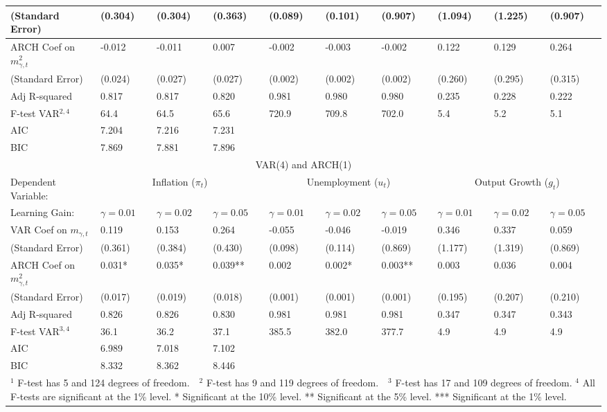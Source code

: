 \documentclass[12pt]{article}
\begin{document}
\begin{table}
\begin{small}
\begin{center}
\begin{tabular}{l|p{0.64in} p{0.64in} p{0.64in}|p{0.64in} p{0.64in} p{0.64in}|p{0.64in} p{0.64in} p{0.64in}}
(Standard Error) & (0.304) & (0.304) & (0.363) & (0.089) & (0.101) & (0.907) & (1.094) & (1.225) & (0.907) \\ \hline
ARCH Coef on $m_{\gamma,t}^2$ & -0.012 & -0.011 & 0.007 & -0.002 & -0.003 & -0.002 & 0.122 & 0.129 & 0.264 \\
(Standard Error) & (0.024) & (0.027) & (0.027) & (0.002) & (0.002) & (0.002) & (0.260) & (0.295) & (0.315) \\ \hline
Adj R-squared & 0.817 & 0.817 & 0.820 & 0.981 & 0.980 & 0.980 & 0.235 & 0.228 & 0.222 \\ 
F-test VAR$^{2,4}$ & 64.4 & 64.5 & 65.6 & 720.9 & 709.8 & 702.0 & 5.4 & 5.2 & 5.1 \\ 
AIC & 7.204 & 7.216 & 7.231   & & &   & & & \\ 
BIC & 7.869 & 7.881 & 7.896   & & &   & & & \\ \hline \hline
\multicolumn{10}{c}{VAR(4) and ARCH(1)} \\ \hline \hline
Dependent Variable:  & \multicolumn{3}{c|}{Inflation ($\pi_t$)} & \multicolumn{3}{c|}{Unemployment ($u_t$)} &  \multicolumn{3}{c}{Output Growth ($g_t$)} \\ \hline
Learning Gain: & $\gamma=0.01$ & $\gamma=0.02$ & $\gamma=0.05$ & $\gamma=0.01$ & $\gamma=0.02$ & $\gamma=0.05$& $\gamma=0.01$ & $\gamma=0.02$ & $\gamma=0.05$ \\ \hline
VAR Coef on $m_{\gamma,t}$ & 0.119 & 0.153 & 0.264 & -0.055 & -0.046 & -0.019 & 0.346 & 0.337 & 0.059 \\
(Standard Error) & (0.361) & (0.384) & (0.430) & (0.098) & (0.114) & (0.869) & (1.177) & (1.319) & (0.869) \\ \hline
ARCH Coef on $m_{\gamma,t}^2$ & 0.031* & 0.035* & 0.039** & 0.002 & 0.002* & 0.003** & 0.003 & 0.036 & 0.004 \\
(Standard Error) & (0.017) & (0.019) & (0.018) & (0.001) & (0.001) & (0.001) & (0.195) & (0.207) & (0.210) \\ \hline
Adj R-squared & 0.826 & 0.826 & 0.830 & 0.981 & 0.981 & 0.981 & 0.347 & 0.347 & 0.343 \\ 
F-test VAR$^{3,4}$ & 36.1 & 36.2 & 37.1 & 385.5 & 382.0 & 377.7 & 4.9 & 4.9 & 4.9 \\ 
AIC & 6.989 & 7.018 & 7.102   & & &   & & & \\ 
BIC & 8.332 & 8.362 & 8.446   & & &   & & & \\ \hline \hline
\multicolumn{10}{p{8.7in}}{$^1$ F-test has 5 and 124 degrees of freedom.~~$^2$ F-test has 9 and 119 degrees of freedom.~~$^3$ F-test has 17 and 109 degrees of freedom.\newline
$^4$ All F-tests are significant at the 1\% level. \newline
* Significant at the 10\% level.  ** Significant at the 5\% level.  *** Significant at the 1\% level.}\\
\end{tabular}
\end{center}
\end{small}
\end{table}
\end{document}
